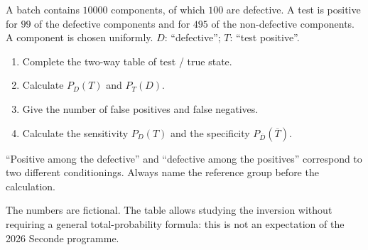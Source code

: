 \begin{example}A batch contains $10000$ components, of which $100$ are defective. A test is positive for $99$ of the defective components and for $495$ of the non-defective components. A component is chosen uniformly. $D$: ``defective''; $T$: ``test positive''.
\begin{enumerate}\item Complete the two-way table of test / true state.\item Calculate $P_D(T)$ and $P_T(D)$.\item Give the number of false positives and false negatives.\item Calculate the sensitivity $P_D(T)$ and the specificity $P_{\overline D}(\overline T)$.\end{enumerate}\end{example}
\begin{keypoint}
``Positive among the defective'' and ``defective among the positives'' correspond to two different conditionings. Always name the reference group before the calculation.
\end{keypoint}
\begin{teachernote}The numbers are fictional. The table allows studying the inversion without requiring a general total-probability formula: this is not an expectation of the 2026 Seconde programme.\end{teachernote}


